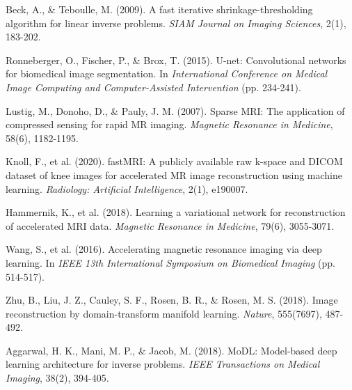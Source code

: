 \documentclass[11pt,a4paper]{article}
\begin{document}
\begin{thebibliography}{99}

Beck, A., \& Teboulle, M. (2009). A fast iterative shrinkage-thresholding algorithm for linear inverse problems. \textit{SIAM Journal on Imaging Sciences}, 2(1), 183-202.

Ronneberger, O., Fischer, P., \& Brox, T. (2015). U-net: Convolutional networks for biomedical image segmentation. In \textit{International Conference on Medical Image Computing and Computer-Assisted Intervention} (pp. 234-241).

Lustig, M., Donoho, D., \& Pauly, J. M. (2007). Sparse MRI: The application of compressed sensing for rapid MR imaging. \textit{Magnetic Resonance in Medicine}, 58(6), 1182-1195.

Knoll, F., et al. (2020). fastMRI: A publicly available raw k-space and DICOM dataset of knee images for accelerated MR image reconstruction using machine learning. \textit{Radiology: Artificial Intelligence}, 2(1), e190007.

Hammernik, K., et al. (2018). Learning a variational network for reconstruction of accelerated MRI data. \textit{Magnetic Resonance in Medicine}, 79(6), 3055-3071.

Wang, S., et al. (2016). Accelerating magnetic resonance imaging via deep learning. In \textit{IEEE 13th International Symposium on Biomedical Imaging} (pp. 514-517).

Zhu, B., Liu, J. Z., Cauley, S. F., Rosen, B. R., \& Rosen, M. S. (2018). Image reconstruction by domain-transform manifold learning. \textit{Nature}, 555(7697), 487-492.

Aggarwal, H. K., Mani, M. P., \& Jacob, M. (2018). MoDL: Model-based deep learning architecture for inverse problems. \textit{IEEE Transactions on Medical Imaging}, 38(2), 394-405.

\end{thebibliography}
\end{document}
